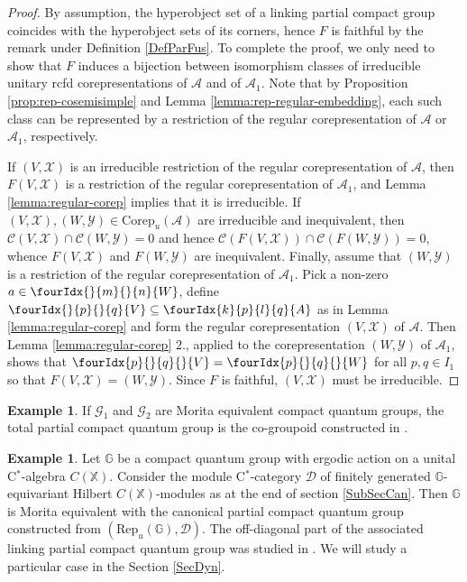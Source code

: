 \documentclass[10pt]{article}
\newcommand{\Corep}{\mathrm{Corep}}
\newcommand{\G}{\mathbb{G}}
\newcommand{\X}{\mathbb{X}}
\newcommand{\CatD}{\mathcal{D}}
\newcommand{\Rep}{\mathrm{Rep}}
\newcommand{\Gr}[5]{\fourIdx{#2}{#4}{#3}{#5}{#1}}%
\newcommand{\Gru}[3]{\Gr{#1}{}{}{#2}{#3}}
\newcommand{\Grd}[3]{\Gr{#1}{#2}{#3}{}{}}
\theoremstyle{definition}
\newtheorem{Exa}[Theorem]{Example}
\numberwithin{equation}{section}
\begin{document}
\begin{proof}
By assumption, the hyperobject set of a linking partial compact group coincides with the hyperobject sets of its corners, hence $F$ is faithful by the remark under Definition \ref{DefParFus}.
To complete the proof, we only need to show that $F$ induces a
bijection between isomorphism classes of irreducible unitary rcfd
corepresentations of $\mathcal{A}$ and of $\mathcal{A}_{1}$. Note that
by Proposition \ref{prop:rep-cosemisimple} and Lemma
\ref{lemma:rep-regular-embedding}, each such class can be represented
by a restriction of the regular corepresentation of $\mathcal{A}$ or
$\mathcal{A}_{1}$, respectively.

If $(V,\mathscr{X})$ is an irreducible restriction of the regular
corepresentation of $\mathcal{A}$, then $F(V,\mathscr{X})$ is a
restriction of the regular corepresentation of $\mathcal{A}_{1}$, and
Lemma \ref{lemma:regular-corep} implies that it is irreducible.  
If $(V,\mathscr{X}), (W,\mathscr{Y}) \in \Corep_{u}(\mathcal{A})$ are
irreducible and inequivalent, then $\mathcal{C}(V,\mathscr{X}) \cap
\mathcal{C}(W,\mathscr{Y})=0$ and hence $\mathcal{C}(F(V,\mathscr{X}))
\cap\mathcal{C}(F(W,\mathscr{Y})) =0$, whence $F(V,\mathscr{X})$ and
$F(W,\mathscr{Y})$ are inequivalent.
Finally, assume that $(W,\mathscr{Y})$ is a restriction of the regular
corepresentation of $\mathcal{A}_{1}$. Pick a non-zero $a \in
\Gru{W}{m}{n}$, define $\Gru{V}{p}{q} \subseteq \Gr{A}{k}{l}{p}{q}$ as
in Lemma \ref{lemma:regular-corep} and form the regular corepresentation
$(V,\mathscr{X})$ of $\mathscr{A}$. Then Lemma
\ref{lemma:regular-corep} 2., applied to the corepresentation
$(W,\mathscr{Y})$ of $\mathcal{A}_{1}$, shows that $\Grd{V}{p}{q} =
\Grd{W}{p}{q}$ for all $p,q\in I_{1}$ so that $F(V,\mathscr{X}) =
(W,\mathscr{Y})$. Since $F$ is faithful, $(V,\mathscr{X})$ must be
irreducible.
\end{proof}

\begin{Exa} If $\mathscr{G}_1$ and $\mathscr{G}_2$ are Morita equivalent compact quantum groups, the total partial compact quantum group is the co-groupoid constructed in \cite{Bic1}. 
\end{Exa}

\begin{Exa}  Let $\G$ be a compact quantum group with ergodic action on a unital C$^*$-algebra $C(\mathbb{X})$. Consider the module C$^*$-category $\CatD$ of finitely generated $\G$-equivariant Hilbert $C(\mathbb{X})$-modules as at the end of section \ref{SubSecCan}. Then $\G$ is Morita equivalent with the canonical partial compact quantum group constructed from $(\Rep_u(\G),\CatD)$. The off-diagonal part of the associated linking partial compact quantum group was studied in \cite{DCY1}. We will study a particular case in the Section \ref{SecDyn}.

\end{Exa}
\end{document}
